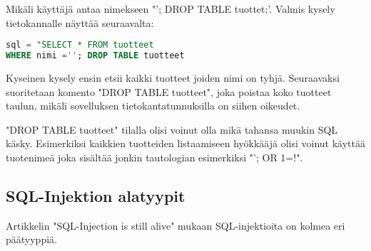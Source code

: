 \documentclass[finnish]{tktltiki2}
\theoremstyle{definition}
\theoremstyle{remark}
\begin{document}
Mikäli käyttäjä antaa nimekseen "'; DROP TABLE tuottet;'. Valmis kysely tietokannalle näyttää seuraavalta:

\begin{lstlisting}[language=sql]
sql = "SELECT * FROM tuotteet
WHERE nimi =''; DROP TABLE tuotteet                             
\end{lstlisting}

Kyseinen kysely ensin etsii kaikki tuotteet joiden nimi on tyhjä. Seuraavaksi suoritetaan komento "DROP TABLE tuotteet", joka poistaa koko tuotteet taulun, mikäli sovelluksen tietokantatunnuksilla on siihen oikeudet. 

"DROP TABLE tuotteet" tilalla olisi voinut olla mikä tahansa muukin SQL käsky. Esimerkiksi kaikkien tuotteiden listaamiseen hyökkääjä olisi voinut käyttää tuotenimeä joka sisältää jonkin tautologian esimerkiksi "'; OR 1=!".

\subsection{SQL-Injektion alatyypit}
Artikkelin "SQL-Injection is still alive"  mukaan SQL-injektioita on kolmea eri päätyyppiä\cite{still-alive}.
\end{document}
